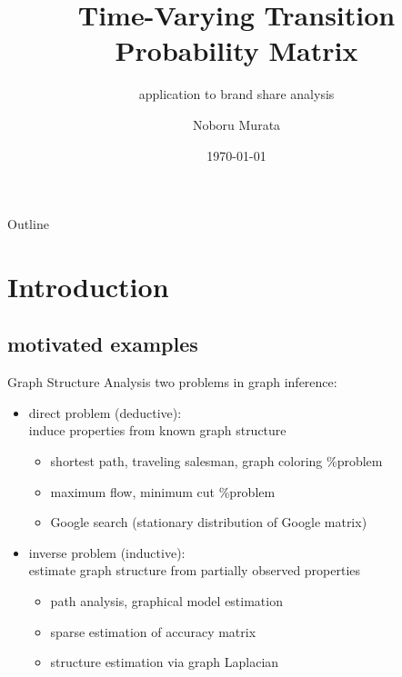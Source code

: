 \documentclass[fleqn,aspectratio=1610]{beamer}
\author{Noboru Murata}
\date{\today}
\title{Time-Varying Transition Probability Matrix}
\subtitle{application to brand share analysis}
\institute{\url{https://noboru-murata.github.io/}}
\begin{document}
\maketitle
\begin{frame}{Outline}
\tableofcontents
\end{frame}


\section{Introduction}
\label{sec:org901277c}
\subsection{motivated examples}
\label{sec:orgba54c54}
\begin{frame}[label={sec:orga0eb2ac}]{Graph Structure Analysis}
two problems in graph inference:
\begin{itemize}
\item \alert{direct problem (deductive)}: \\[0pt]
induce properties from known graph structure
\begin{itemize}
\item shortest path, traveling salesman, graph coloring \%problem
\item maximum flow, minimum cut \%problem
\item Google search (stationary distribution of Google matrix)
\end{itemize}
\item \alert{inverse problem (inductive)}: \\[0pt]
estimate graph structure from partially observed properties
\begin{itemize}
\item path analysis, graphical model estimation
\item sparse estimation of accuracy matrix
\item structure estimation via graph Laplacian
\end{itemize}
\end{itemize}
\end{frame}
\end{document}

